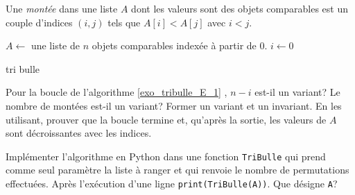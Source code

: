 Une \emph{montée} dans une liste $A$ dont les valeurs sont des objets comparables est un couple d'indices $(i,j)$ tels que $A[i] < A[j]$ avec $i<j$.

\begin{algorithm}
  $A \leftarrow$ une liste de $n$ objets comparables indexée à partir de 0.\;
  $i\leftarrow 0$\;
  \caption{tri bulle}
  \label{exo_tribulle_E_1}
\end{algorithm}
Pour la boucle de l'algorithme \ref{exo_tribulle_E_1} , $n-i$ est-il un variant? Le nombre de montées est-il un variant? Former un variant et un invariant. En les utilisant, prouver que la boucle termine et, qu'après la sortie, les valeurs de $A$ sont décroissantes avec les indices.

Implémenter l'algorithme en Python dans une fonction \verb|TriBulle| qui prend comme seul paramètre la liste à ranger et qui renvoie le nombre de permutations effectuées.\newline
Après l'exécution d'une ligne \verb|print(TriBulle(A))|. Que désigne \verb|A|?